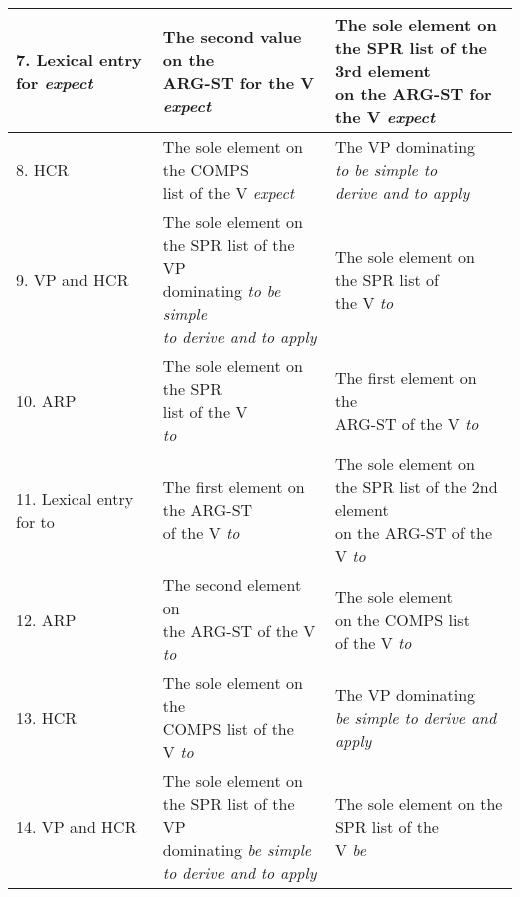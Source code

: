 \documentclass[12pt]{article}
\begin{document}
\begin{tiny}
\begin{footnotesize}
\begin{longtable}{|l|l|l|}
7. Lexical entry for {\it expect} & \makecell{The second value on the \\ARG-ST for the V {\it expect}} & \makecell{The sole element on \\ the SPR list of the 3rd element \\ on the ARG-ST for the V {\it expect}} \\ \hline
8. HCR & \makecell{The sole element on the COMPS\\ list of the V {\it expect}} & \makecell{The VP dominating\\ {\it to be simple to} \\{\it derive and to apply}} \\ \hline
9. VP and HCR & \makecell{The sole element on \\ the SPR list of the VP \\ dominating {\it to be simple} \\{\it to derive and to apply}}  & \makecell{The sole element on \\ the SPR list of \\ the V {\it to}} \\ \hline
10. ARP &   \makecell{The sole element on the SPR \\ list of the V\\ {\it to}} &  \makecell{The first element on the\\ ARG-ST of the V {\it to}} \\ \hline
11. Lexical entry for to&   \makecell{The first element on the ARG-ST\\ of the V {\it to}} &  \makecell{The sole element on \\the SPR list of the 2nd element\\ on the ARG-ST of the V {\it to}} \\ \hline
12. ARP &  \makecell{The second element on \\the ARG-ST of the V\\ {\it to}} &  \makecell{The sole element \\on the COMPS list \\of the V {\it to}}\\ \hline
13. HCR &  \makecell{The sole element on the \\ COMPS list of the \\ V {\it to}} &  \makecell{The VP dominating \\{\it be simple to} {\it derive and apply}} \\ \hline
14. VP and HCR &  \makecell{The sole element on \\ the SPR list of the VP \\ dominating {\it be simple} \\{\it to derive and to apply}} &  \makecell{The sole element on the \\ SPR list of the \\ V {\it be}} \\ \hline

\end{longtable}
\end{footnotesize}
\end{tiny}
\end{document}

